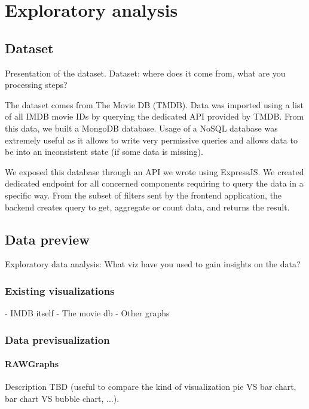 \documentclass[a4paper,10pt]{article}
\begin{document}
\section{Exploratory analysis}

\subsection{Dataset}

Presentation of the dataset.
Dataset: where does it come from, what are you processing steps?

The dataset comes from The Movie DB (TMDB). Data was imported
using a list of all IMDB movie IDs by querying the dedicated API provided by TMDB.
From this data, we built a MongoDB database. Usage of a NoSQL database was extremely
useful as it allows to write very permissive queries and allows data to be into
an inconsistent state (if some data is missing).

We exposed this database through an API we wrote using ExpressJS. We created dedicated
endpoint for all concerned components requiring to query the data in a specific way.
From the subset of filters sent by the frontend application, the backend creates
query to get, aggregate or count data, and returns the result.

\subsection{Data preview}

Exploratory data analysis: What viz have you used to gain insights on the data?

\subsubsection{Existing visualizations}

- IMDB itself
- The movie db
- Other graphs

\subsubsection{Data previsualization}

\paragraph{RAWGraphs}

Description TBD (useful to compare the kind of visualization pie VS bar chart,
bar chart VS bubble chart, ...).
\end{document}
